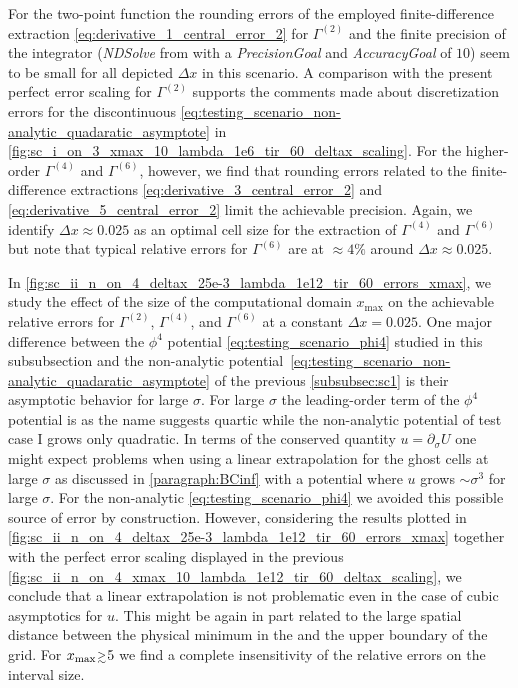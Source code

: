 For the two-point function the rounding errors of the employed finite-difference extraction \eqref{eq:derivative_1_central_error_2} for $\Gamma^{(2)}$ and the finite precision of the \ode{} integrator (\textit{NDSolve} from \WAMXIIwR{} with a \textit{PrecisionGoal} and \textit{AccuracyGoal} of $10$) seem to be small for all depicted $\Delta x$ in this scenario. 
A comparison with the present perfect error scaling for $\Gamma^{(2)}$ supports the comments made about discretization errors for the discontinuous \ic{} \eqref{eq:testing_scenario_non-analytic_quadaratic_asymptote} in \cref{fig:sc_i_on_3_xmax_10_lambda_1e6_tir_60_deltax_scaling}.
For the higher-order \nptFunctions{} $\Gamma^{(4)}$ and $\Gamma^{(6)}$, however, we find that rounding errors related to the finite-difference extractions \eqref{eq:derivative_3_central_error_2} and \eqref{eq:derivative_5_central_error_2} limit the achievable precision.
Again, we identify $\Delta x \approx 0.025$ as an optimal cell size for the extraction of $\Gamma^{(4)}$ and $\Gamma^{(6)}$ but note that typical relative errors for $\Gamma^{(6)}$ are at $\approx 4 \%$ around $\Delta x \approx 0.025$.

In \cref{fig:sc_ii_n_on_4_deltax_25e-3_lambda_1e12_tir_60_errors_xmax}, we study the effect of the size of the computational domain $x_\mathrm{max}$ on the achievable relative errors for $\Gamma^{(2)}$, $\Gamma^{(4)}$, and $\Gamma^{(6)}$ at a constant $\Delta x =0.025$. 
One major difference between the $\phi^4$ potential \eqref{eq:testing_scenario_phi4} studied in this subsubsection and the non-analytic potential~\eqref{eq:testing_scenario_non-analytic_quadaratic_asymptote} of the previous \cref{subsubsec:sc1} is their asymptotic behavior for large $\sigma$.
For large $\sigma$ the leading-order term of the $\phi^4$ potential is \dash{} as the name suggests \dash{} quartic while the non-analytic potential of test case I grows only quadratic.
In terms of the conserved quantity $u = \partial_\sigma U$ one might expect problems when using a linear extrapolation for the ghost cells at large $\sigma$ as discussed in \cref{paragraph:BCinf} with a potential where $u$ grows $\sim \sigma^3$ for large $\sigma$.
For the non-analytic \ic{} \eqref{eq:testing_scenario_phi4} we avoided this possible source of error by construction.
However, considering the results plotted in \cref{fig:sc_ii_n_on_4_deltax_25e-3_lambda_1e12_tir_60_errors_xmax} together with the perfect error scaling displayed in the previous \cref{fig:sc_ii_n_on_4_xmax_10_lambda_1e12_tir_60_deltax_scaling}, we conclude that a linear extrapolation is not problematic even in the case of cubic asymptotics for $u$.
This might be again in part related to the large spatial distance between the physical minimum in the \ir{} and the upper boundary of the grid.
For $x_\mathrm{max}\smallergtrsim 5$ we find a complete insensitivity of the relative errors on the interval size.

